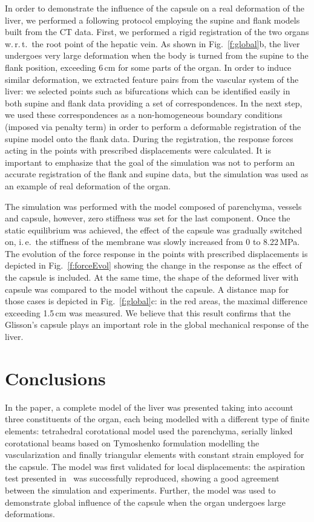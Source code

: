 \documentclass{llncs}
\def\wrt{w.\,r.\,t.}
\def\ie{i.\,e.}
\begin{document}
In order to demonstrate the influence of the capsule on a real deformation of the liver, we 
performed a following protocol employing the supine and flank models built from the CT data. 
First, we performed a rigid registration of the two organs \wrt\ the root point of the hepatic vein. 
As shown in Fig.~\ref{f:global}b, the liver undergoes very large deformation when the body 
is turned from the supine to the flank position, exceeding 6\,cm for some parts of the organ. 
In order to induce similar deformation, we extracted feature pairs from the vascular system of the liver:
we selected points such as bifurcations which can be identified easily in both supine and flank 
data providing a set of correspondences. In the next step, we used these correspondences as a non-homogeneous
boundary conditions (imposed via penalty term) in order to perform a deformable registration of the supine
model onto the flank data. During the registration, the response forces acting in the points with prescribed displacements
were calculated. It is important to emphasize that the goal of the simulation was not 
to perform an accurate registration of the flank and supine data, but the simulation was used 
as an example of real deformation of the organ.

The simulation was performed with the model composed of parenchyma,  vessels and capsule, however, zero stiffness was 
set for the last component.
Once the static equilibrium was achieved, the effect of the capsule was gradually switched 
on, \ie\ the stiffness of the membrane was slowly increased from 0 to 8.22\,MPa. The evolution of the force response in the 
points with prescribed displacements is depicted in Fig.~\ref{f:forceEvol} showing the change in the response as the effect
of the capsule is included. At the same time, the shape of the deformed liver with capsule was compared 
to the model without the capsule. A distance map for those cases is depicted in Fig.~\ref{f:global}c: in the red areas, the 
maximal difference exceeding 1.5\,cm was measured. We believe that this result confirms that the Glisson's capsule 
plays an important role in the global mechanical response of the liver.


\section{Conclusions} %
In the paper, a complete model of the liver was presented taking into account 
three constituents of the organ, each being modelled with a different type 
of finite elements: tetrahedral corotational model used the parenchyma, serially 
linked corotational beams based on Tymoshenko formulation modelling the vascularization 
and finally triangular elements with constant strain employed for the capsule. 
The model was first validated for local displacements: the aspiration test presented in~\cite{Hollenstein2006} 
was successfully reproduced, showing a good agreement between the simulation and experiments. 
Further, the model was used to demonstrate global influence of the capsule when the organ 
undergoes large deformations. 
\end{document}
